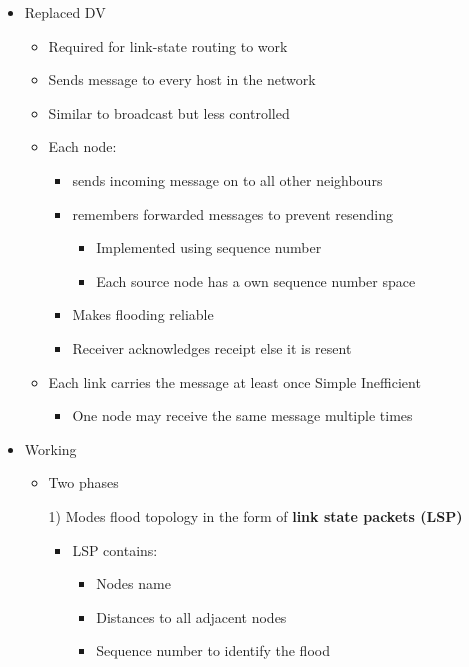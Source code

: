 \begin{itemize}
\begin{itemize}
        \item Replaced DV
            \begin{itemize}
                \item Required for link-state routing to work
                \item Sends message to every host in the network
                \item Similar to broadcast but less controlled
                \item Each node:
                    \begin{itemize}
                        \item sends incoming message on to all other neighbours
                        \item remembers forwarded messages to prevent resending
                            \begin{itemize}
                                \item Implemented using sequence number
                                \item Each source node has a own sequence number space
                            \end{itemize}
                    \end{itemize}
                    \begin{itemize}
                        \item Makes flooding reliable
                        \item Receiver acknowledges receipt else it is resent
                    \end{itemize}
                \item Each link carries the message at least once
                \ipro Simple
                \icon Inefficient
                    \begin{itemize}
                        \item One node may receive the same message multiple times
                    \end{itemize}
            \end{itemize}
        \item Working
            \begin{itemize}
                \item Two phases
                \item[1)] Modes flood topology in the form of \textbf{link state packets (LSP)}
                    \begin{itemize}
                        \item LSP contains:
                            \begin{itemize}
                                \item Nodes name
                                \item Distances to all adjacent nodes
                                \item Sequence number to identify the flood
                            \end{itemize}


\end{itemize}
\end{itemize}
\end{itemize}
\end{itemize}
